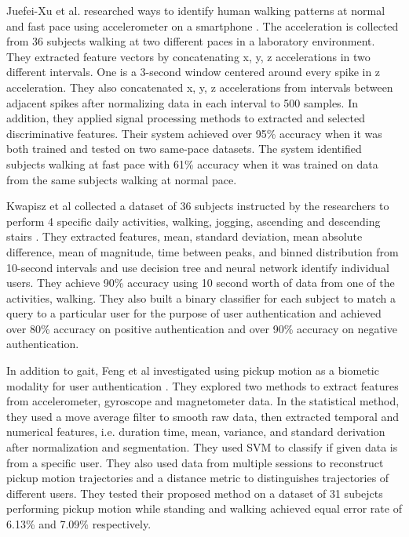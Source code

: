 \documentclass{soups}
\begin{document}
Juefei-Xu et al. researched ways to identify human walking patterns at normal and fast pace using accelerometer on a smartphone \cite{xu:pace}. The acceleration is collected from 36 subjects walking at two different paces in a laboratory environment. They extracted feature vectors by concatenating x, y, z accelerations in two different intervals. One is a 3-second window centered around every spike in z acceleration. They also concatenated x, y, z accelerations from intervals between adjacent spikes after normalizing data in each interval to 500 samples. In addition, they applied signal processing methods to extracted and selected discriminative features. Their system achieved over 95\% accuracy when it was both trained and tested on two same-pace datasets. The system identified subjects walking at fast pace with 61\% accuracy when it was trained on data from the same subjects walking at normal pace.

Kwapisz et al collected a dataset of 36 subjects instructed by the researchers to perform 4 specific daily activities, walking, jogging, ascending and descending stairs \cite{kwapisz:biometrics}. They extracted features, mean, standard deviation, mean absolute difference, mean of magnitude, time between peaks, and binned distribution from 10-second intervals and use decision tree and neural network identify individual users. They achieve 90\% accuracy using 10 second worth of data from one of the activities, walking. They also built a binary classifier for each subject to match a query to a particular user for the purpose of user authentication and achieved over 80\% accuracy on positive authentication and over 90\% accuracy on negative authentication.

In addition to gait, Feng et al investigated using pickup motion as a biometic modality for user authentication \cite{feng:pickup}. They explored two methods to extract features from accelerometer, gyroscope and magnetometer data. In the statistical method, they used a move average filter to smooth raw data, then extracted temporal and numerical features, i.e. duration time, mean, variance, and standard derivation after normalization and segmentation. They used SVM to classify if given data is from a specific user. They also used data from multiple sessions to reconstruct pickup motion trajectories and a distance metric to distinguishes trajectories of different users. They tested their proposed method on a dataset of 31 subejcts performing pickup motion while standing and walking achieved equal error rate of 6.13\% and 7.09\% respectively.
\end{document}
